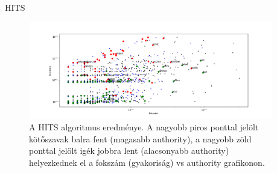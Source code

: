 \documentclass{beamer}
\newlength{\sepwid}
\newlength{\twocolwid}
\begin{document}
\begin{frame}[t]
\begin{columns}[t]
\begin{column}{\twocolwid}
      \begin{block}{HITS}
        \begin{figure}[h]
          \begin{center}
            \includegraphics[width=\columnwidth]{conj-verb-auth.png}
                  \caption{A HITS algoritmus eredménye.
                  A nagyobb piros ponttal jelölt kötőszavak balra fent
                  (magasabb authority),
                  a nagyobb zöld ponttal jelölt igék jobbra lent
                  (alacsonyabb authority)
                  helyezkednek el
                  a fokszám (gyakoriság) vs authority grafikonon.}
          \end{center}
                \label{fig:hits-auth}
        \end{figure}
      \end{block}
    \end{column}

    \begin{column}{\sepwid} \end{column}			%


\end{columns}
\end{frame}
\end{document}
